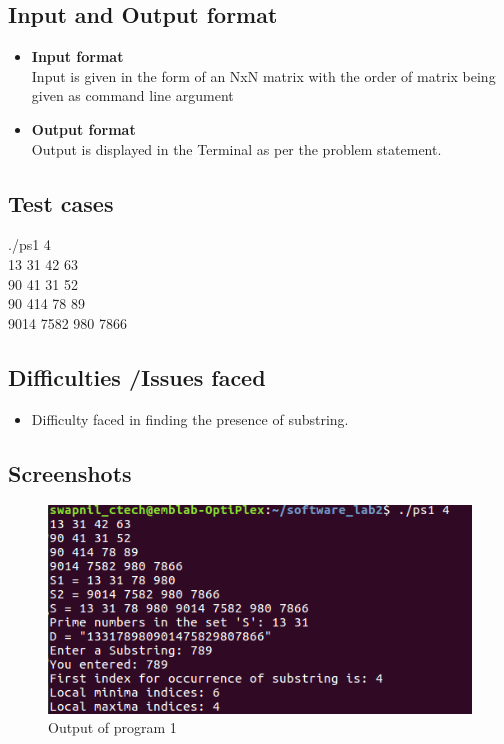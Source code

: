 \documentclass[12pt,a4paper]{article}
\begin{document}
        \subsection{Input and Output format}
            \begin{itemize}
                \item \textbf{Input format}\\Input is given in the form of an NxN matrix with the order of matrix being given as command line argument
                \item \textbf{Output format}\\Output is displayed in the Terminal as per the problem statement.
            \end{itemize}
        \subsection{Test cases}
            ./ps1 4\\
            13 31 42 63\\
            90 41 31 52\\
            90 414 78 89\\ 
            9014 7582 980 7866\\

        \subsection{Difficulties /Issues faced}
            \begin{itemize}
                \item Difficulty faced in finding the presence of substring.
            \end{itemize}
        \subsection{Screenshots}
            \begin{figure}[H]
                \centering
                \includegraphics[width=\linewidth]{ps1.png}
                \caption{Output of program 1}
                \label{fig:my_label_1}
            \end{figure}
\end{document}
